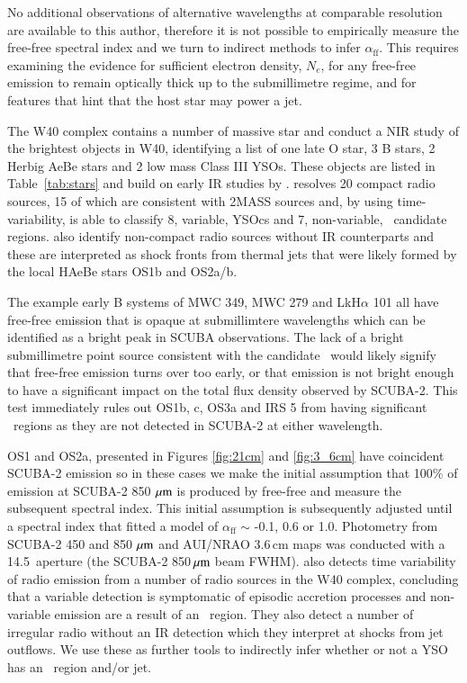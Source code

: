No additional observations of alternative wavelengths at comparable resolution are available to this author, therefore it is not possible to empirically measure the free-free spectral index and we turn to indirect methods to infer 
$\alpha_{\mathrm{ff}}$. 
This requires examining the evidence for sufficient electron density, $N_e$, for any free-free emission to remain optically thick up to the submillimetre regime, and for features that hint that the host star may power a jet. 

The W40 complex contains a number of massive star and 
\cite{Shuping:2012ly} conduct a NIR study of the brightest objects in W40, identifying a list of one late O star, 3 B stars, 2 Herbig AeBe stars and 2 low mass Class III YSOs. These objects are listed in Table~\ref{tab:stars} and build on early IR studies by \cite{Smith:1985bv}.  \cite{Rodriguez:2010bs} resolves 20 compact radio sources, 15 of which are consistent with 2MASS sources and, by using time-variability, is able to classify 8, variable, YSOcs and 7, non-variable, \UCHII\ candidate regions. \cite{Rodriguez:2010bs} also identify non-compact radio sources without IR counterparts and these are interpreted as shock fronts from thermal jets that were likely formed by the local HAeBe stars OS1b and OS2a/b. 

The example early B systems of MWC 349, MWC 279 and LkH$\alpha$ 101 \citep{Sandell:2011dz} all have free-free emission that is opaque at submillimtere wavelengths which can be identified as a bright peak in SCUBA observations. The lack of a bright submillimetre point source consistent with the candidate \UCHII\ would likely signify that free-free emission turns over too early, or that emission is not bright enough to have a significant impact on the total flux density observed by SCUBA-2. This test immediately rules out OS1b, c, OS3a and IRS 5 from having significant \UCHII\  regions as they are not detected in SCUBA-2 at either wavelength. 
 
OS1 and OS2a, presented in Figures \ref{fig:21cm} and \ref{fig:3_6cm} have coincident SCUBA-2 emission so in these cases we make the initial assumption that 100\% of emission at SCUBA-2 850\,$\,\mu\rm{m}$ is produced by free-free and measure the subsequent spectral index. This initial assumption is subsequently adjusted until a spectral index that fitted a model of $\alpha_{\mathrm{ff}}$ $\sim$ -0.1, 0.6 or 1.0. Photometry from SCUBA-2 450 and 850\,$\,\mu\rm{m}$ and AUI/NRAO 3.6\,cm maps was conducted with a 14.5\arcsec\ aperture (the SCUBA-2 850$\,\mu\rm{m}$ beam FWHM). %
\cite{Rodriguez:2010bs} also detects time variability of radio emission from a number of radio sources in the W40 complex, concluding that a variable detection is symptomatic of episodic accretion processes and non-variable emission are a result of an \UCHII\ region. They also detect a number of irregular radio without an IR detection which they interpret at shocks from jet outflows. We use these as further tools to indirectly infer whether or not a YSO has an \UCHII\ region and/or jet.

